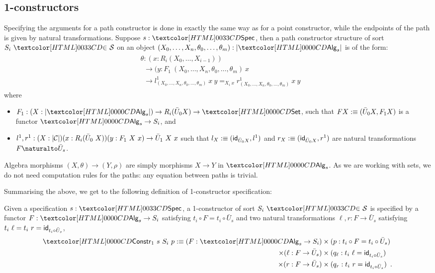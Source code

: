 \subsection{1-constructors}

Specifying the arguments for a path constructor is done in exactly the
same way as for a point constructor, while the endpoints of the path
is given by natural transformations. Suppose $s : \specty$, then a path
constructor structure of sort $\sortsin{S_i}{\Ss}$ on an object
$(X_0, \hdots, X_n, \theta_0,\hdots,\theta_m) : | \Alg_s |$ is of the
form:
\begin{align}
\label{eq:theta}
  \begin{split}
    &\theta : (x : R_i (X_0, \hdots, X_{i-1})) \\
    &\ \ \to (y : F_1\ (X_0, \hdots, X_n, \theta_0, \hdots, \theta_m)\ x \\
    &\ \ \to l^1_{(X_0,\hdots,X_n,\theta_0,\hdots,\theta_m)}\ x\ y =_{X_i\ x} r^1_{(X_0,\hdots,X_n,\theta_0,\hdots,\theta_m)}\ x\ y 
  \end{split}
\end{align}
where
\begin{itemize}
\item $F_1 : (X : | \Alg_s |) \to R_i (\bar{U}_0 X) \to \Set$, such
  that $F X :\equiv (\bar{U}_0 X, F_1 X)$ is a functor $\Alg_s \to S_i$, and
\item
  $l^1, r^1 : (X : | \mathcal{C} |) (x : R_i (\bar{U}_0\ X)) (y : F_1\ X\ x)
  \to \bar{U}_1\ X\ x$
  such that $l_X :\equiv (\mathsf{id}_{\bar{U}_0 X}, l^1)$ and
  $r_X :\equiv (\mathsf{id}_{\bar{U}_0 X}, r^1)$ are natural transformations
  $\Nat{F}{\bar{U}_s}$.
\end{itemize}
Algebra morphisms $(X,\theta) \to (Y,\rho)$ are simply morphisms
$X \to Y$ in $\Alg_s$. As we are working with sets, we do not need
computation rules for the paths: any equation between paths is
trivial.

Summarising the above, we get to the following definition of
1-constructor specification:

\begin{definition}
  Given a specification $s : \specty$, a 1-constructor of sort
  $\sortsin{S_i}{\Ss}$ is specified by a functor
  $F : \Alg_s \to S_i$ satisfying $t_i \circ F = t_i \circ \bar{U}_s$
  and two natural transformations $\ell, r : F \to \bar{U}_s$ satisfying
  $t_i\ \ell = t_i\ r = \mathsf{id}_{t_i \circ \bar{U}_s}$, \ie
\begin{align*}
\Constr_1\ s\ S_i\ p \ddefeq (F : \Alg_s \to S_i) &\times (p : t_i \circ F = t_i \circ \bar{U}_s) \\ \times (\ell : F \to \bar{U}_s) &\times (q_\ell : t_i\ \ell = \id_{t_i \circ \bar{U}_s}) \\ \times (r : F \to \bar{U}_s) &\times (q_r : t_i\ r = \id_{t_i \circ \bar{U}_s}) \enspace .
\end{align*}
\end{definition}

